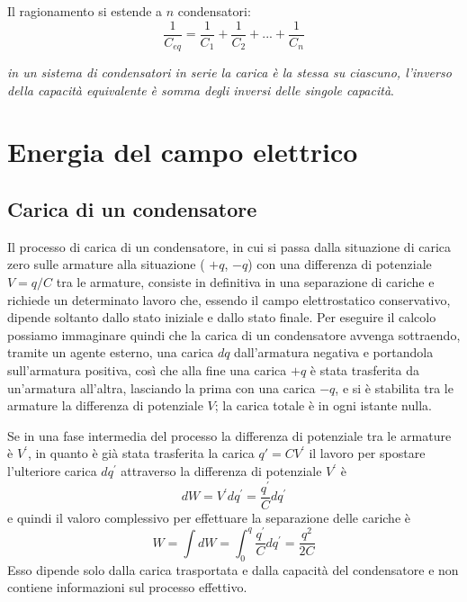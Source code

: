 \documentclass[class=book, crop=false, oneside, 12pt]{standalone}
\begin{document}
Il ragionamento si estende a \(n\) condensatori:
\begin{equation}
    \frac{1}{C_{eq}} =  \frac{1}{C_{1}} +  \frac{1}{C_{2}} + ... +  \frac{1}{C_n}
\end{equation}

\emph{in un sistema di condensatori in serie la carica è la stessa su ciascuno, l'inverso della capacità equivalente è somma degli inversi delle singole capacità}. 

\section{Energia del campo elettrico}

\subsection{Carica di un condensatore}

Il processo di carica di un condensatore, in cui si passa dalla situazione di carica zero sulle armature alla situazione ( \(+q\), \(-q\)) con una differenza di potenziale \(V =q / C\) tra le armature, consiste in definitiva in una separazione di cariche e richiede un determinato lavoro che, essendo il campo elettrostatico conservativo, dipende soltanto dallo stato iniziale e dallo stato finale.
Per eseguire il calcolo possiamo immaginare quindi che la carica di un condensatore avvenga sottraendo, tramite un agente esterno, una carica \(dq\) dall'armatura negativa e portandola sull'armatura positiva, così che alla fine una carica \(+q\) è stata trasferita da un'armatura all'altra, lasciando la prima con una carica \(-q\), e si è stabilita tra le armature la differenza di potenziale \(V\); la carica totale è in ogni istante nulla.

Se in una fase intermedia del processo la differenza di potenziale tra le armature è \(V^{\prime}\), in quanto è già stata trasferita la carica \(q' = C V^{\prime}\) il lavoro per spostare l'ulteriore carica \(dq^{\prime}\) attraverso la differenza di potenziale \(V^{\prime}\) è
\begin{equation*}
    d W = V^{\prime} d q^{\prime} = \frac{q^{\prime}}{C} d q^{\prime}
\end{equation*}
e quindi il valoro complessivo per effettuare la separazione delle cariche è
\begin{equation*}
    W = \int dW = \int_0^q \frac{q^{\prime}}{C}d q^{\prime} = \frac{q^2}{2 C}
\end{equation*}
Esso dipende solo dalla carica trasportata e dalla capacità del condensatore e non contiene informazioni sul processo effettivo.
\end{document}

